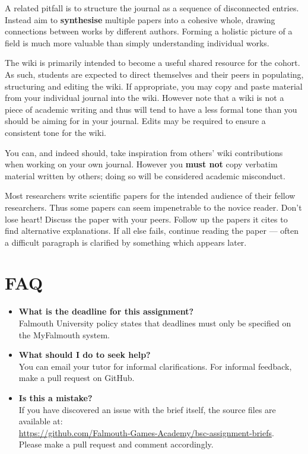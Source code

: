 \documentclass{../../fal_assignment}
\begin{document}
A related pitfall is to structure the journal as a sequence of disconnected entries.
Instead aim to \textbf{synthesise} multiple papers into a cohesive whole,
drawing connections between works by different authors.
Forming a holistic picture of a field is much more valuable than simply understanding individual works.

The wiki is primarily intended to become a useful shared resource for the cohort.
As such, students are expected to direct themselves and their peers in populating, structuring and editing the wiki.
If appropriate, you may copy and paste material from your individual journal into the wiki.
However note that a wiki is not a piece of academic writing
and thus will tend to have a less formal tone than you should be aiming for in your journal.
Edits may be required to ensure a consistent tone for the wiki.

You can, and indeed should, take inspiration from others' wiki contributions when working on your own journal.
However you \textbf{must not} copy verbatim material written by others;
doing so will be considered academic misconduct.

Most researchers write scientific papers for the intended audience of their fellow researchers.
Thus some papers can seem impenetrable to the novice reader.
Don't lose heart!
Discuss the paper with your peers.
Follow up the papers it cites to find alternative explanations.
If all else fails, continue reading the paper --- often a difficult paragraph is clarified by something which appears later.

\section*{FAQ}

\begin{itemize}
	\item 	\textbf{What is the deadline for this assignment?} \\ 
    		Falmouth University policy states that deadlines must only be specified on the MyFalmouth system.
    		
	\item 	\textbf{What should I do to seek help?} \\ 
    		You can email your tutor for informal clarifications. For informal feedback, make a pull request on GitHub. 
    		
    	\item 	\textbf{Is this a mistake?} \\ 	
    		If you have discovered an issue with the brief itself, the source files are available at: \\
    		\url{https://github.com/Falmouth-Games-Academy/bsc-assignment-briefs}.\\
    		 Please make a pull request and comment accordingly.
\end{itemize}
\end{document}

